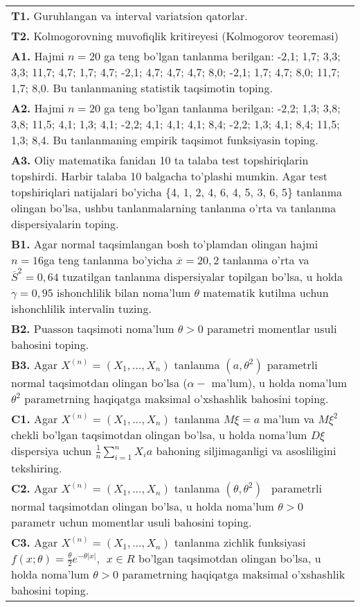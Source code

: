 \documentclass{article}
\begin{document}
\begin{tabular}{m{17cm}}
\textbf{T1.} 
Guruhlangan va interval variatsion qatorlar.
\\
\textbf{T2.} 
Kolmogorovning muvofiqlik kritireyesi (Kolmogorov teoremasi)
\\
\textbf{A1.} 
Hajmi \(n = 20\) ga teng bo'lgan tanlanma berilgan: -2,1; 1,7; 3,3; 3,3; 11,7; 4,7; 1,7; 4,7; -2,1; 4,7; 4,7; 4,7; 8,0; -2,1; 1,7; 4,7; 8,0; 11,7; 1,7; 8,0. Bu tanlanmaning statistik taqsimotin toping.
\\
\textbf{A2.} 
Hajmi \(n = 20\) ga teng bo'lgan tanlanma berilgan: -2,2; 1,3; 3,8; 3,8; 11,5; 4,1; 1,3; 4,1; -2,2; 4,1; 4,1; 4,1; 8,4; -2,2; 1,3; 4,1; 8,4; 11,5; 1,3; 8,4. Bu tanlanmaning empirik taqsimot funksiyasin toping.
\\
\textbf{A3.} 
Oliy matematika fanidan 10 ta talaba test topshiriqlarin topshirdi. Harbir talaba 10 balgacha to'plashi mumkin. Agar test topshiriqlari natijalari bo'yicha \{4, 1, 2, 4, 6, 4, 5, 3, 6, 5\} tanlanma olingan bo'lsa, ushbu tanlanmalarning tanlanma o'rta va tanlanma dispersiyalarin toping.
\\
\textbf{B1.} 
Agar normal taqsimlangan bosh to'plamdan olingan hajmi \(n = 16\)ga teng tanlanma bo'yicha \(\overline{x} = 20,2\) tanlanma o'rta va \({\overline{S}}^{2} = 0,64\) tuzatilgan tanlanma dispersiyalar topilgan bo'lsa, u holda \(\gamma = 0,95\) ishonchlilik bilan noma'lum \(\theta\) matematik kutilma uchun ishonchlilik intervalin tuzing.
\\
\textbf{B2.} 
Puasson taqsimoti noma'lum \(\theta > 0\) parametri momentlar usuli bahosini toping.
\\
\textbf{B3.} 
Agar \(X^{(n)} = \left( X_{1},...,X_{n} \right)\) tanlanma \(\left( a,\theta^{2} \right)\) parametrli normal taqsimotdan olingan bo'lsa (\(\alpha -\) ma'lum), u holda noma'lum \(\theta^{2}\) parametrning haqiqatga maksimal o'xshashlik bahosini toping.
\\
\textbf{C1.} 
Agar \(X^{(n)} = \left( X_{1},...,X_{n} \right)\) tanlanma \(M\xi = a\) ma'lum va \(M\xi^{2}\) chekli bo'lgan taqsimotdan olingan bo'lsa, u holda noma'lum \(D\xi\) dispersiya uchun \(\frac{1}{n}\sum_{i = 1}^{n}{X_{i}a}\) bahoning siljimaganligi va asosliligini tekshiring.
\\
\textbf{C2.} 
Agar \(X^{(n)} = \left( X_{1},...,X_{n} \right)\) tanlanma \((\theta,\theta^{2})\ \ \) parametrli normal taqsimotdan olingan bo'lsa, u holda noma'lum \(\theta > 0\) parametr uchun momentlar usuli bahosini toping.
\\
\textbf{C3.} 
Agar \(X^{(n)} = \left( X_{1},...,X_{n} \right)\) tanlanma zichlik funksiyasi\(f(x;\theta) = \frac{\theta}{2}e^{- \theta|x|},\ \ x \in R\) bo'lgan taqsimotdan olingan bo'lsa, u holda noma'lum \(\theta > 0\) parametrning haqiqatga maksimal o'xshashlik bahosini toping.
\\

\end{tabular}
\vspace{1cm}
\end{document}
